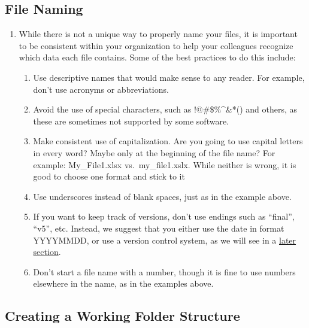 \documentclass[
]{book}
\providecommand{\tightlist}{%
  \setlength{\itemsep}{0pt}\setlength{\parskip}{0pt}}
\begin{document}
\hypertarget{file-naming}{%
\subsection{File Naming}\label{file-naming}}

\begin{enumerate}
\def\labelenumi{\arabic{enumi}.}
\tightlist
\item
  While there is not a unique way to properly name your files, it is important to be consistent within your organization to help your colleagues recognize which data each file contains. Some of the best practices to do this include:

  \begin{enumerate}
  \def\labelenumii{\arabic{enumii}.}
  \tightlist
  \item
    Use descriptive names that would make sense to any reader. For example, don't use acronyms or abbreviations.
  \item
    Avoid the use of special characters, such as !@\#\$\%\^{}\&*() and others, as these are sometimes not supported by some software.
  \item
    Make consistent use of capitalization. Are you going to use capital letters in every word? Maybe only at the beginning of the file name? For example: My\_File1.xlsx vs.~my\_file1.xslx. While neither is wrong, it is good to choose one format and stick to it
  \item
    Use underscores instead of blank spaces, just as in the example above.
  \item
    If you want to keep track of versions, don't use endings such as ``final'', ``v5'', etc. Instead, we suggest that you either use the date in format YYYYMMDD, or use a version control system, as we will see in a \protect\hyperlink{version-control}{later section}.
  \item
    Don't start a file name with a number, though it is fine to use numbers elsewhere in the name, as in the examples above.
  \end{enumerate}
\end{enumerate}

\hypertarget{creating-a-working-folder-structure}{%
\subsection{Creating a Working Folder Structure}\label{creating-a-working-folder-structure}}
\end{document}
